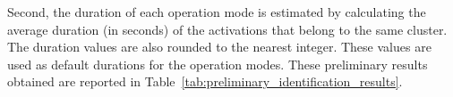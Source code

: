 Second, the duration of each operation mode is estimated by calculating the average duration (in seconds) of the activations that belong to the same cluster. The duration values are also rounded to the nearest integer. These values are used as default durations for the operation modes. These preliminary results obtained are reported in Table~\ref{tab:preliminary_identification_results}.

\begin{table}[hbt]
\centering
{}
\end{table}
